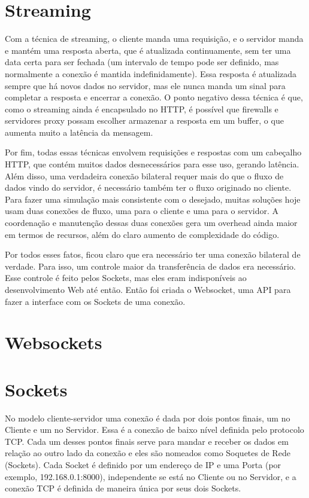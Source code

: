\documentclass[a4paper,12pt]{article}
\begin{document}
\section{Streaming}

Com a técnica de streaming, o cliente manda uma requisição, e o servidor manda e mantém uma resposta aberta, que é atualizada continuamente, sem ter uma data certa para ser fechada (um intervalo de tempo pode ser definido, mas normalmente a conexão é mantida indefinidamente). Essa resposta é atualizada sempre que há novos dados no servidor, mas ele nunca manda um sinal para completar a resposta e encerrar a conexão. O ponto negativo dessa técnica é que, como o streaming ainda é encapsulado no HTTP, é possível que firewalls e servidores proxy possam escolher armazenar a resposta em um buffer, o que aumenta muito a latência da mensagem.



Por fim, todas essas técnicas envolvem requisições e respostas com um cabeçalho HTTP, que contém muitos dados desnecessários para esse uso, gerando latência. Além disso, uma verdadeira conexão bilateral requer mais do que o fluxo de dados vindo do servidor, é necessário também ter o fluxo originado no cliente. Para fazer uma simulação mais consistente com o desejado, muitas soluções hoje usam duas conexões de fluxo, uma para o cliente e uma para o servidor. A coordenação e manutenção dessas duas conexões gera um overhead ainda maior em termos de recursos, além do claro aumento de complexidade do código.


Por todos esses fatos, ficou claro que era necessário ter uma conexão bilateral de verdade. Para isso, um controle maior da transferência de dados era necessário. Esse controle é feito pelos Sockets, mas eles eram indisponíveis ao desenvolvimento Web até então. Então foi criada o Websocket, uma API para fazer a interface com os Sockets de uma conexão.




\section{Websockets}


\section{Sockets}

No modelo cliente-servidor uma conexão é dada por dois pontos finais, um no Cliente e um no Servidor. Essa é a conexão de baixo nível definida pelo protocolo TCP. Cada um desses pontos finais serve para mandar e receber os dados em relação ao outro lado da conexão e eles são nomeados como Soquetes de Rede (Sockets). Cada Socket é definido por um endereço de IP e uma Porta (por exemplo, 192.168.0.1:8000), independente se está no Cliente ou no Servidor, e a conexão TCP é definida de maneira única por seus dois Sockets.
\end{document}
